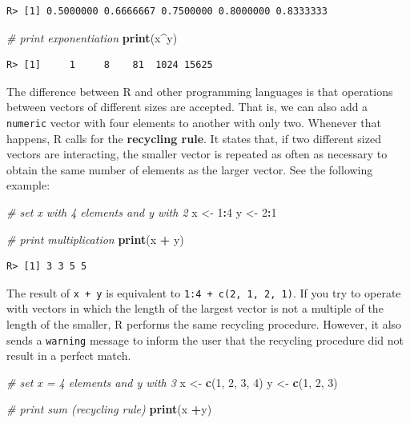 \documentclass[
  12pt,
]{book}
\newenvironment{Shaded}{\begin{snugshade}}{\end{snugshade}}
\newcommand{\CommentTok}[1]{\textcolor[rgb]{0.37,0.37,0.37}{\textit{#1}}}
\newcommand{\DecValTok}[1]{\textcolor[rgb]{0.06,0.06,0.06}{#1}}
\newcommand{\KeywordTok}[1]{\textcolor[rgb]{0.27,0.27,0.27}{\textbf{#1}}}
\newcommand{\NormalTok}[1]{#1}
\newcommand{\OperatorTok}[1]{\textcolor[rgb]{0.43,0.43,0.43}{\textbf{#1}}}
\newcommand{\StringTok}[1]{\textcolor[rgb]{0.5,0.5,0.5}{#1}}
\begin{document}
\begin{verbatim}
R> [1] 0.5000000 0.6666667 0.7500000 0.8000000 0.8333333
\end{verbatim}

\begin{Shaded}
\begin{Highlighting}[]
\CommentTok{# print exponentiation}
\KeywordTok{print}\NormalTok{(x}\OperatorTok{^}\NormalTok{y)}
\end{Highlighting}
\end{Shaded}

\begin{verbatim}
R> [1]     1     8    81  1024 15625
\end{verbatim}

The difference between R and other programming languages is that operations between vectors of different sizes are accepted. That is, we can also add a \texttt{numeric} vector with four elements to another with only two. Whenever that happens, R calls for the \textbf{recycling rule}. It states that, if two different sized vectors are interacting, the smaller vector is repeated as often as necessary to obtain the same number of elements as the larger vector. See the following example: 

\begin{Shaded}
\begin{Highlighting}[]
\CommentTok{# set x with 4 elements and y with 2}
\NormalTok{x <-}\StringTok{ }\DecValTok{1}\OperatorTok{:}\DecValTok{4}
\NormalTok{y <-}\StringTok{ }\DecValTok{2}\OperatorTok{:}\DecValTok{1}

\CommentTok{# print multiplication}
\KeywordTok{print}\NormalTok{(x }\OperatorTok{+}\StringTok{ }\NormalTok{y)}
\end{Highlighting}
\end{Shaded}

\begin{verbatim}
R> [1] 3 3 5 5
\end{verbatim}

The result of \texttt{x\ +\ y} is equivalent to \texttt{1:4\ +\ c(2,\ 1,\ 2,\ 1)}. If you try to operate with vectors in which the length of the largest vector is not a multiple of the length of the smaller, R performs the same recycling procedure. However, it also sends a \texttt{warning} message to inform the user that the recycling procedure did not result in a perfect match.

\begin{Shaded}
\begin{Highlighting}[]
\CommentTok{# set x = 4 elements and y with 3}
\NormalTok{x <-}\StringTok{ }\KeywordTok{c}\NormalTok{(}\DecValTok{1}\NormalTok{, }\DecValTok{2}\NormalTok{, }\DecValTok{3}\NormalTok{, }\DecValTok{4}\NormalTok{)}
\NormalTok{y <-}\StringTok{ }\KeywordTok{c}\NormalTok{(}\DecValTok{1}\NormalTok{, }\DecValTok{2}\NormalTok{, }\DecValTok{3}\NormalTok{)}

\CommentTok{# print sum (recycling rule)}
\KeywordTok{print}\NormalTok{(x }\OperatorTok{+}\NormalTok{y)}
\end{Highlighting}
\end{Shaded}
\end{document}
